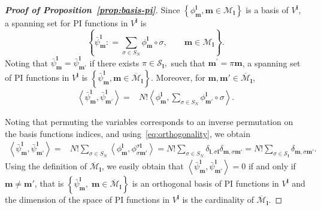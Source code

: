 \documentclass{article}
\newcommand{\bpsi}[2]{\bar\psi^{#1}_{#2}}
\numberwithin{equation}{section}
\def\bl{{\bm l}}
\def\bbm{{\bm m}}
\def\calM{\mathcal{M}}
\def\calS{\mathcal{S}}
\def\oMl{\overline{\calM}_\bl}
\def\Nat{{N}}
\begin{document}
\begin{proof}[\bf{Proof of Proposition~\ref{prop:basis-pi}}]
    Since $\left\{ \phi^\bl_\bbm, \bbm\in \calM_\bl \right\}$  is 
    a basis of $V^{\bl}$, a spanning set for PI functions in $V^{\bl}$ is 
\[
    \left\{ \displaystyle\bpsi{\bl}{\bbm}: =\sum_{\sigma\in S_\Nat}\phi^\bl_\bbm\circ\sigma, \qquad \bbm\in \calM_\bl \right\}.
\]
Noting that $\bpsi{\bl}{\bbm}=\bpsi{\bl}{\bbm'}$ if there exists $\pi\in \calS_{\bl},$ such that $\bbm^{\prime}=\pi\bbm$, a spanning set 
of PI functions in $V^\bl$ is
$\left\{ \displaystyle\bpsi{\bl}{\bbm}, \bbm\in \oMl \right\}$.
Moreover, for $\bbm,\bbm'\in \oMl$,
\begin{align*}
    \left\langle\bpsi{\bl}{\bbm},\bpsi{\bl}{\bbm'}\right\rangle =& 
    \Nat!\left\langle\phi^\bl_\bbm, \sum_{\sigma\in S_\Nat}\phi^\bl_{\bbm'}\circ\sigma\right\rangle.
\end{align*}

Noting that permuting the variables corresponds to an inverse permutation on the basis functions indices, and using~\eqref{eq:orthogonality}, we obtain
\begin{align*}
\left\langle\bpsi{\bl}{\bbm},\bpsi{\bl}{\bbm'}\right\rangle
    = & \Nat !\sum_{\sigma\in S_\Nat}\left\langle\phi^\bl_\bbm, \phi^{\sigma\bl}_{\sigma\bbm'}\right\rangle 
    =  \Nat !\sum_{\sigma\in S_\Nat}\delta_{\bl,\sigma\bl}\delta_{\bbm,\sigma\bbm'} 
    =  \Nat !\sum_{\sigma\in \calS_\bl}\delta_{\bbm,\sigma\bbm'}. 
\end{align*}
Using the definition of $\oMl$, we easily obtain that 
$\left\langle\bpsi{\bl}{\bbm},\bpsi{\bl}{\bbm'}\right\rangle = 0$ if and only if $\bbm \neq \bbm'$, that is $\left\{ \displaystyle\bpsi{\bl}{\bbm},\; \bbm\in \oMl \right\}$ is an orthogonal basis of PI functions in $V^\bl$ and the dimension of the space of PI functions in $V^\bl$ is the cardinality of $\oMl$.
\end{proof}
\end{document}
